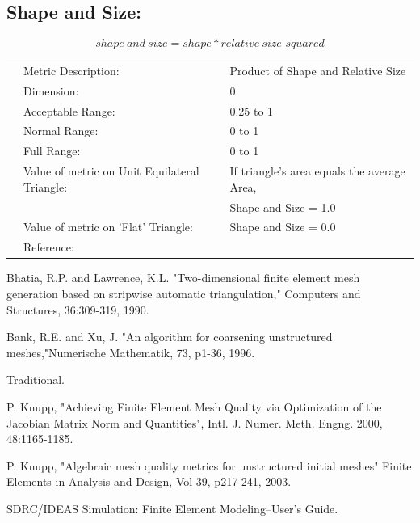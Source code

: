 \documentclass[12pt]{article}
\begin{document}
\subsection*{Shape and Size:}
\begin{displaymath}
  shape~and~size = shape * relative~size \textrm{-}squared 
\end{displaymath}

\begin{tabular}{lll}
& Metric Description:  & Product of Shape and Relative Size \\
& Dimension:           & 0                                  \\ 
& Acceptable Range:    & 0.25 to 1                                     \\ 
& Normal Range:        & 0 to 1                           \\ 
& Full Range:          & 0 to 1                           \\ 
& Value of metric on Unit Equilateral Triangle: & If triangle's area equals the average Area,  \\
&                      & Shape and Size = 1.0 \\
& Value of metric on 'Flat' Triangle:  & Shape and Size = 0.0 \\ 
& Reference:           &  \cite{five} \\
\end{tabular} 



\begin{thebibliography}{99}

 Bhatia, R.P. and Lawrence, K.L. "Two-dimensional 
finite element mesh generation based on stripwise automatic
triangulation," Computers and Structures, 36:309-319, 1990. 

 Bank, R.E. and Xu, J.  "An algorithm 
for coarsening unstructured meshes,"Numerische Mathematik, 
73, p1-36, 1996. 

 Traditional.

 P. Knupp, "Achieving Finite Element Mesh Quality
via Optimization of the Jacobian Matrix Norm and Quantities", 
Intl. J. Numer. Meth. Engng. 2000, 48:1165-1185.

 P. Knupp, "Algebraic mesh quality metrics for 
unstructured initial meshes" Finite Elements in Analysis and 
Design, Vol 39, p217-241, 2003. 

 SDRC/IDEAS Simulation: Finite Element 
Modeling--User's Guide.


\end{thebibliography}
\end{document}

